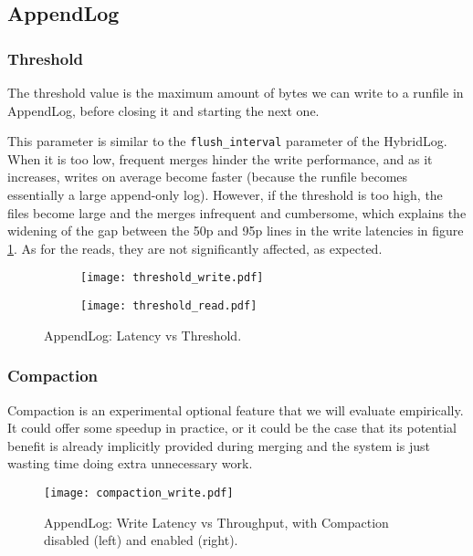 \subsection{AppendLog}

\subsubsection{Threshold}

The threshold value is the maximum amount of bytes we can write to a runfile in AppendLog, before closing it and starting the next one.

This parameter is similar to the \verb"flush_interval" parameter of the HybridLog. When it is too low, frequent merges hinder the write performance, and as it increases, writes on average become faster (because the runfile becomes essentially a large append-only log). However, if the threshold is too high, the files become large and the merges infrequent and cumbersome, which explains the widening of the gap between the 50p and 95p lines in the write latencies in figure \ref{fig:threshold_write_read}. As for the reads, they are not significantly affected, as expected.

\begin{figure}[h]
    \begin{subfigure}{.5\textwidth}
        \centering
        \texttt{[image: threshold\_write.pdf]}
    \end{subfigure}
    \begin{subfigure}{.5\textwidth}
        \centering
        \texttt{[image: threshold\_read.pdf]}
    \end{subfigure}
    \caption{AppendLog: Latency vs Threshold.}
    \label{fig:threshold_write_read}
\end{figure}

\subsubsection{Compaction}

Compaction is an experimental optional feature that we will evaluate empirically. It could offer some speedup in practice, or it could be the case that its potential benefit is already implicitly provided during merging and the system is just wasting time doing extra unnecessary work.

\begin{figure}[h]
    \centering
    \texttt{[image: compaction\_write.pdf]}
    \caption{AppendLog: Write Latency vs Throughput, with Compaction disabled (left) and enabled (right).}
    \label{fig:compaction-write}
\end{figure}

